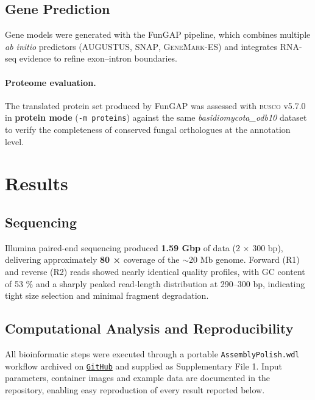\documentclass[Journal,letterpaper]{ascelike-new}
\begin{document}
\subsection*{Gene Prediction}

Gene models were generated with the FunGAP pipeline, which combines multiple
\textit{ab initio} predictors (\textsc{AUGUSTUS}, \textsc{SNAP},
\textsc{GeneMark-ES}) and integrates RNA-seq evidence to refine exon–intron
boundaries.

\paragraph{Proteome evaluation.}
The translated protein set produced by FunGAP was assessed with
\textsc{busco} v5.7.0 in \textbf{protein mode} (\texttt{-m proteins})
against the same \textit{basidiomycota\_odb10} dataset to verify the
completeness of conserved fungal orthologues at the annotation level.

\section*{Results}

\subsection*{Sequencing}

Illumina paired-end sequencing produced \textbf{1.59 Gbp} of data (2 × 300 bp), delivering
approximately \textbf{80 ×} coverage of the \(\sim\)20 Mb genome.
Forward (R1) and reverse (R2) reads showed nearly identical quality profiles,
with GC content of 53 \% and a sharply peaked read-length distribution at
290–300 bp, indicating tight size selection and minimal fragment degradation.

\subsection*{Computational Analysis and Reproducibility}

All bioinformatic steps were executed through a portable
\texttt{AssemblyPolish.wdl} workflow archived on \href{https://github.com/lmtani/s-scitamineum-pipelines}{\texttt{GitHub}}
and supplied as Supplementary File 1.  Input parameters, container images and
example data are documented in the repository, enabling easy
reproduction of every result reported below.
\end{document}
